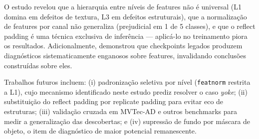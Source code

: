 \documentclass[conference]{IEEEtran}
\begin{document}
O estudo revelou que a hierarquia entre níveis de features não é universal (L1 domina em defeitos de textura, L3 em defeitos estruturais), que a normalização de features por canal não generaliza (prejudicial em 1 de 5 classes), e que o reflect padding é uma técnica exclusiva de inferência --- aplicá-lo no treinamento piora os resultados. Adicionalmente, demonstrou que checkpoints legados produzem diagnósticos sistematicamente enganosos sobre features, invalidando conclusões construídas sobre eles.

Trabalhos futuros incluem: (i) padronização seletiva por nível (\texttt{featnorm} restrita a L1), cujo mecanismo identificado neste estudo prediz resolver o caso \textit{yoke}; (ii) substituição do reflect padding por replicate padding para evitar eco de estruturas; (iii) validação cruzada em MVTec-AD e outros benchmarks para medir a generalização das descobertas; e (iv) supressão de fundo por máscara de objeto, o item de diagnóstico de maior potencial remanescente.
\end{document}
